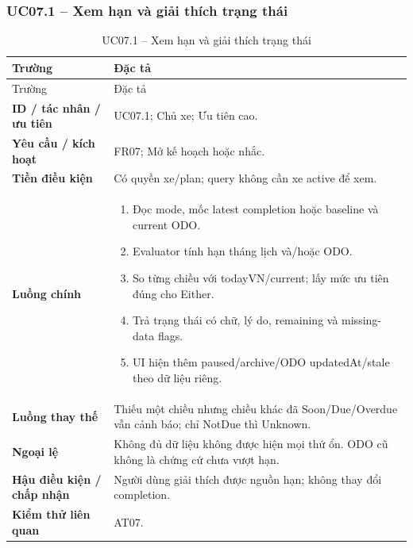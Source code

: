 \subsubsection{UC07.1 -- Xem hạn và giải thích trạng thái}\label{uc:UC07.1}
\begin{smalltable}\begin{longtable}{L{3.2cm}L{11.8cm}}
\caption{UC07.1 -- Xem hạn và giải thích trạng thái}\label{tab:UC07.1}\\
\toprule Trường & Đặc tả\\\midrule\endfirsthead
\toprule Trường & Đặc tả\\\midrule\endhead
\textbf{ID / tác nhân / ưu tiên} & UC07.1; Chủ xe; Ưu tiên cao.\\
\textbf{Yêu cầu / kích hoạt} & FR07; Mở kế hoạch hoặc nhắc.\\
\textbf{Tiền điều kiện} & Có quyền xe/plan; query không cần xe active để xem.\\
\textbf{Luồng chính} & \begin{enumerate}[leftmargin=*,nosep]
\item Đọc mode, mốc latest completion hoặc baseline và current ODO.
\item Evaluator tính hạn tháng lịch và/hoặc ODO.
\item So từng chiều với todayVN/current; lấy mức ưu tiên đúng cho Either.
\item Trả trạng thái có chữ, lý do, remaining và missing-data flags.
\item UI hiện thêm paused/archive/ODO updatedAt/stale theo dữ liệu riêng.
\end{enumerate}\\
\textbf{Luồng thay thế} & Thiếu một chiều nhưng chiều khác đã Soon/Due/Overdue vẫn cảnh báo; chỉ NotDue thì Unknown.\\
\textbf{Ngoại lệ} & Không đủ dữ liệu không được hiện mọi thứ ổn. ODO cũ không là chứng cứ chưa vượt hạn.\\
\textbf{Hậu điều kiện / chấp nhận} & Người dùng giải thích được nguồn hạn; không thay đổi completion.\\
\textbf{Kiểm thử liên quan} & AT07.\\
\bottomrule\end{longtable}\end{smalltable}

